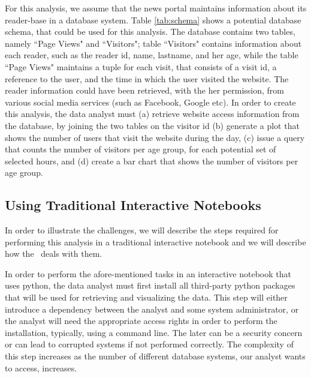 For this analysis, we assume that the news portal maintains information about its reader-base in a database system. Table \ref{tab:schema} shows a potential database schema, that could be used for this analysis. The database contains two tables, namely ``Page Views" and ``Visitors"; table ``Visitors" contains information about each reader, such as the reader id, name, lastname, and her age, while the table ``Page Views" maintains a tuple for each visit, that consists of a visit id, a reference to the user, and the time in which the user visited the website. The reader information could have been retrieved, with the her permission, from various social media services (such as Facebook, Google etc). In order to create this analysis, the data analyst must (a) retrieve  website access information from the database, by joining the two tables on the visitor id (b) generate a plot that shows the number of users that visit the website during the day, (c) issue a query that counts the number of visitors per age group, for each potential set of selected hours, and (d) create a bar chart that shows the number of visitors per age group. 


\subsection{Using Traditional Interactive Notebooks}



In order to illustrate the challenges, we will describe the steps required for performing this analysis in a traditional interactive notebook and we will describe how the \projname\ deals with them.

 In order to perform the afore-mentioned tasks in an interactive notebook that uses python, the data analyst must first install all third-party python packages that will be used for retrieving and visualizing the data. This step will either introduce a dependency between the analyst and some system administrator, or the analyst will need the appropriate access rights in order to perform the installation, typically, using a command line. The later can be a security concern or can lead to corrupted systems if not performed correctly. The complexity of this step increases as the number of different database systems, our analyst wants to access, increases. 

